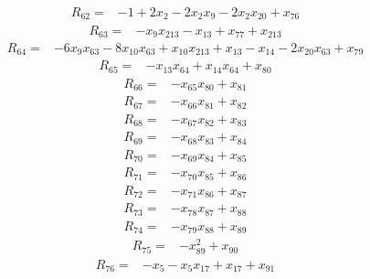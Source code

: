 \begin{align*}
R_{62}={}&-1+2x_{2}-2x_{2}x_{9}-2x_{2}x_{20}+x_{76}
\end{align*}
\begin{align*}
R_{63}={}&-x_{9}x_{213}-x_{13}+x_{77}+x_{213}
\end{align*}
\begin{align*}
R_{64}={}&-6x_{9}x_{63}-8x_{10}x_{63}+x_{10}x_{213}+x_{13}-x_{14}-2x_{20}x_{63}+x_{79}
\end{align*}
\begin{align*}
R_{65}={}&-x_{13}x_{64}+x_{14}x_{64}+x_{80}
\end{align*}
\begin{align*}
R_{66}={}&-x_{65}x_{80}+x_{81}
\end{align*}
\begin{align*}
R_{67}={}&-x_{66}x_{81}+x_{82}
\end{align*}
\begin{align*}
R_{68}={}&-x_{67}x_{82}+x_{83}
\end{align*}
\begin{align*}
R_{69}={}&-x_{68}x_{83}+x_{84}
\end{align*}
\begin{align*}
R_{70}={}&-x_{69}x_{84}+x_{85}
\end{align*}
\begin{align*}
R_{71}={}&-x_{70}x_{85}+x_{86}
\end{align*}
\begin{align*}
R_{72}={}&-x_{71}x_{86}+x_{87}
\end{align*}
\begin{align*}
R_{73}={}&-x_{78}x_{87}+x_{88}
\end{align*}
\begin{align*}
R_{74}={}&-x_{79}x_{88}+x_{89}
\end{align*}
\begin{align*}
R_{75}={}&-x_{89}^{2}+x_{90}
\end{align*}
\begin{align*}
R_{76}={}&-x_{5}-x_{5}x_{17}+x_{17}+x_{91}
\end{align*}
